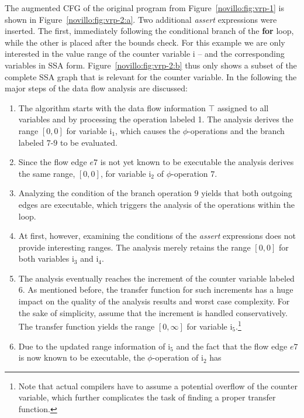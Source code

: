 The augmented CFG of the original program from Figure~\ref{novillo:fig:vrp-1} is
shown in Figure~\ref{novillo:fig:vrp-2:a}. Two additional \emph{assert}
expressions were inserted. The first, immediately following the conditional
branch of the \textbf{for} loop, while the other is placed after the bounds
check. For this example we are only interested in the value range of the counter
variable i -- and the corresponding variables in SSA form.
Figure~\ref{novillo:fig:vrp-2:b} thus only shows a subset of the complete SSA
graph that is relevant for the counter variable. In the following the major
steps of the data flow analysis are discussed:
\begin{enumerate}
\item \label{novillo:vrp:ex:i_1} The algorithm starts with the data flow
      information $\top$ assigned to all variables and by processing the
      operation labeled 1. The analysis derives the range $[0,0]$ for variable
      i$_1$, which causes the $\phi$-operations and the branch labeled $7$-$9$
      to be evaluated.
\item Since the flow edge $e7$ is not yet known to be executable the analysis
      derives the same range, $[0, 0]$, for variable i$_2$ of $\phi$-operation
      $7$.
\item Analyzing the condition of the branch operation $9$ yields that both
      outgoing edges are executable, which triggers the analysis of the
      operations within the loop.
\item At first, however, examining the conditions of the \emph{assert}
      expressions does not provide interesting ranges. The analysis merely
      retains the range $[0, 0]$ for both variables i$_3$ and i$_4$.
\item \label{novillo:vrp:ex:i_5} The analysis eventually reaches the increment
      of the counter variable labeled $6$. As mentioned before, the transfer
      function for such increments has a huge impact on the quality of the
      analysis results and worst case complexity. For the sake of simplicity,
      assume that the increment is handled conservatively. The transfer function
      yields the range $[0, \infty]$ for variable i$_5$.\footnote{Note that
      actual compilers have to assume a potential overflow of the counter
      variable, which further complicates the task of finding a proper transfer
      function.}
\item Due to the updated range information of i$_5$ and the fact that the flow
      edge $e7$ is now known to be executable, the $\phi$-operation of i$_2$ has

\end{enumerate}
